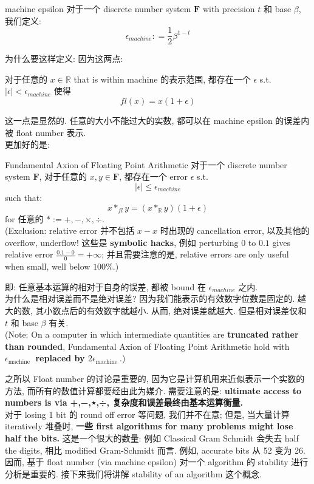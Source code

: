 \begin{definition}{machine epsilon}
对于一个 discrete number system $\mathbf{F}$ with precision $t$ 和 base $\beta$,  我们定义: \[
    \epsilon_{machine}  : = \frac{1}{2} \beta^{1-t}
    \]
\end{definition}
为什么要这样定义: 因为这两点:
\begin{proposition}
    对于任意的 $x\in \mathbb{R}$ that is within machine 的表示范围, 都存在一个 $\epsilon$ s.t. $|\epsilon| < \epsilon_{machine}$ 使得 \[
    fl(x) = x(1+ \epsilon)
    \]
\end{proposition}
这一点是显然的. 任意的大小不能过大的实数, 都可以在 machine epsilon 的误差内被 float number 表示.\\
更加好的是:
\begin{theorem}{Fundamental Axion of Floating Point Arithmetic}
  对于一个 discrete number system $\mathbf{F}$, 对于任意的 $x,y\in \mathbf{F}$, 都存在一个 error $\epsilon$ s.t. \[
  |\epsilon| \leq \epsilon_{machine}
  \]such that:  $$
x *_{fl} y=(x *_{\mathbb{R}} y)(1+\epsilon)
$$
for 任意的 $* := +,-,\times ,\div$.\\
(Exclusion: relative error 并不包括 $x-x$ 时出现的 cancellation error, 以及其他的 overflow, underflow! 这些是\textbf{ symbolic hacks}, 例如 perturbing $0$ to $0.1$ gives relative error $\frac{0.1-0}{0}=+\infty$; 并且需要注意的是, relative errors are only useful when small, well below $100 \%$.)
\end{theorem}
即: 任意基本运算的相对于自身的误差, 都被 bound 在 $\epsilon_{machine}$ 之内.\\
为什么是相对误差而不是绝对误差? 因为我们能表示的有效数字位数是固定的. 越大的数, 其小数点后的有效数字就越小. 从而, 绝对误差就越大. 但是相对误差仅和 $t$ 和 base $\beta$ 有关.\\
(Note: On a computer in which intermediate quantities are \textbf{truncated rather than rounded}, Fundamental Axion of Floating Point Arithmetic hold with\textbf{ $\epsilon_{\text {machine }}$ replaced by $2 \epsilon_{\text {machine }}$}.)\\

\begin{remark}
之所以 Float number 的讨论是重要的, 因为它是计算机用来近似表示一个实数的方法, 而所有的数值计算都要经由此为媒介. 需要注意的是:\textbf{ ultimate access to numbers is via +,−,⋆,÷, 复杂度和误差最终由基本运算衡量.}\\

对于 losing 1 bit  的 round off error 等问题, 我们并不在意; 但是, 当大量计算 iteratively 堆叠时, \textbf{一些 first algorithms for many problems might lose half the bits. } 这是一个很大的数量: 例如 Classical Gram 
Schmidt 会失去 half the digits, 相比 modified Gram-Schmidt 而言. 例如, accurate bits 从 52 变为 26.\\

因而, 基于 float number (via machine epsilon) 对一个 algorithm 的 stability 进行分析是重要的. 接下来我们将讲解 stability of an algorithm 这个概念.
\end{remark}





